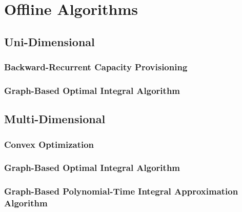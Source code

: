 
\chapter{Offline Algorithms}\label{chapter:offline_algorithms}

\section{Uni-Dimensional}

\subsection{Backward-Recurrent Capacity Provisioning}

\subsection{Graph-Based Optimal Integral Algorithm}

\section{Multi-Dimensional}

\subsection{Convex Optimization}

\subsection{Graph-Based Optimal Integral Algorithm}

\subsection{Graph-Based Polynomial-Time Integral Approximation Algorithm}
